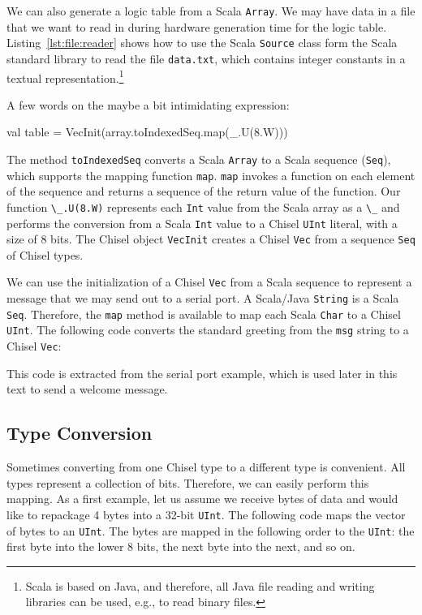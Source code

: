 \documentclass[%
    10pt,
    headinclude, footinclude=false,
    openright, %
    notitlepage,
    cleardoublepage=empty,
    headsepline,
    numbers=noenddot,
    bibliography=totoc, index=totoc,
    ]{scrbook}
\newcommand{\code}[1]{{\lstinline[basicstyle=\small\ttfamily]{#1}}}
\begin{document}

We can also generate a logic table from a Scala \code{Array}.
We may have data in a file that we want to read in during hardware generation
time for the logic table.
Listing~\ref{lst:file:reader} shows how to use the Scala \code{Source}
class form the Scala standard library to read the file \code{data.txt}, which
contains integer constants in a textual representation.\footnote{Scala is
based on Java, and therefore, all Java file reading and writing libraries can
be used, e.g., to read binary files.}

A few words on the maybe a bit intimidating expression:
\begin{chisel}
  val table = VecInit(array.toIndexedSeq.map(_.U(8.W)))
\end{chisel}


\noindent The method \code{toIndexedSeq} converts a Scala \code{Array}
to a Scala sequence (\code{Seq}),
which supports the mapping function \code{map}.
\code{map} invokes a function on each element of the sequence and returns
a sequence of the return value of the function. Our function \code{\_.U(8.W)} represents
each \code{Int} value from the Scala array as a \code{\_} and performs the conversion
from a Scala \code{Int} value to a Chisel \code{UInt} literal, with a size of 8 bits.
The Chisel object \code{VecInit} creates a Chisel \code{Vec} from a sequence \code{Seq}
of Chisel types.

We can use the initialization of a Chisel \code{Vec} from a Scala sequence to represent
a message that we may send out to a serial port.
A Scala/Java \code{String} is a Scala \code{Seq}.
Therefore, the \code{map}
method is available to map each Scala \code{Char} to a Chisel \code{UInt}.
The following code converts the standard greeting
from the \code{msg} string to a Chisel \code{Vec}:


\noindent This code is extracted from the serial port example, which is used later in this text to send a welcome message.

\subsection{Type Conversion}

Sometimes converting from one Chisel type to a different type is convenient.
All types represent a collection of bits. Therefore, we can easily perform this mapping.
As a first example, let us assume we receive bytes of data and would like to repackage
4 bytes into a 32-bit \code{UInt}. The following code maps the vector of bytes to an \code{UInt}.
The bytes are mapped in the following order to the \code{UInt}: the first byte into the lower 8 bits,
the next byte into the next, and so on.
\end{document}
